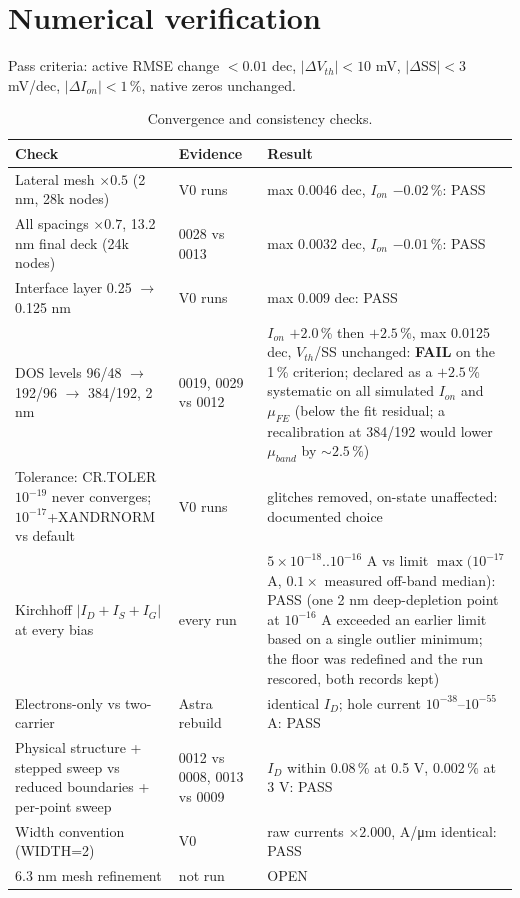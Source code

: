 \documentclass[11pt,a4paper]{article}
\newcommand{\um}{\si{\micro\metre}}
\begin{document}
\section{Numerical verification}\label{sec:num}
Pass criteria: active RMSE change $<0.01$ dec, $|\Delta V_{th}|<10$ mV, $|\Delta$SS$|<3$ mV/dec, $|\Delta I_{on}|<1$\,\%, native zeros unchanged.
\begin{table}[H]\centering\footnotesize
\caption{Convergence and consistency checks.}
\begin{tabular}{p{6.0cm}p{3.0cm}p{6.2cm}}\toprule
Check & Evidence & Result\\\midrule
Lateral mesh $\times0.5$ (2 nm, 28k nodes) & V0 runs & max 0.0046 dec, $I_{on}$ $-0.02$\,\%: PASS\\
All spacings $\times0.7$, 13.2 nm final deck (24k nodes) & 0028 vs 0013 & max 0.0032 dec, $I_{on}$ $-0.01$\,\%: PASS\\
Interface layer 0.25 $\to$ 0.125 nm & V0 runs & max 0.009 dec: PASS\\
DOS levels 96/48 $\to$ 192/96 $\to$ 384/192, 2 nm & 0019, 0029 vs 0012 & $I_{on}$ $+2.0$\,\% then $+2.5$\,\%, max 0.0125 dec, $V_{th}$/SS unchanged: \textbf{FAIL} on the 1\,\% criterion; declared as a $+2.5$\,\% systematic on all simulated $I_{on}$ and $\mu_{FE}$ (below the fit residual; a recalibration at 384/192 would lower $\mu_{band}$ by $\sim2.5$\,\%)\\
Tolerance: CR.TOLER $10^{-19}$ never converges; $10^{-17}$+XANDRNORM vs default & V0 runs & glitches removed, on-state unaffected: documented choice\\
Kirchhoff $|I_D+I_S+I_G|$ at every bias & every run & $5\times10^{-18}$..$10^{-16}$ A vs limit $\max(10^{-17}$ A, $0.1\times$ measured off-band median): PASS (one 2 nm deep-depletion point at $10^{-16}$ A exceeded an earlier limit based on a single outlier minimum; the floor was redefined and the run rescored, both records kept)\\
Electrons-only vs two-carrier & Astra rebuild & identical $I_D$; hole current $10^{-38}$--$10^{-55}$ A: PASS\\
Physical structure + stepped sweep vs reduced boundaries + per-point sweep & 0012 vs 0008, 0013 vs 0009 & $I_D$ within 0.08\,\% at 0.5 V, 0.002\,\% at 3 V: PASS\\
Width convention (WIDTH=2) & V0 & raw currents $\times2.000$, A/\um{} identical: PASS\\
6.3 nm mesh refinement & not run & OPEN\\
\bottomrule\end{tabular}
\end{table}
\end{document}
